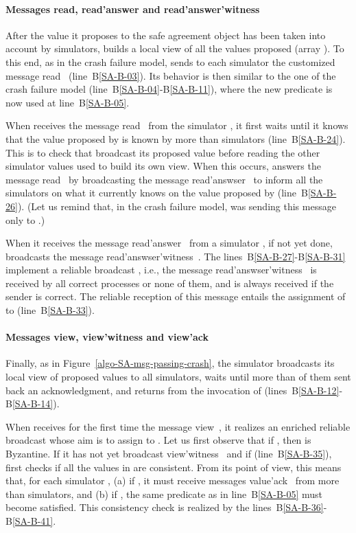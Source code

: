 \documentclass[11pt,letterpaper]{article}
\begin{document}
\paragraph{Messages {\sc read}, {\sc read'answer} and
          {\sc read'answer'witness}}
 After the value  it proposes to the safe agreement object has been
taken  into  account by  simulators,    builds a
local view  of all the values proposed (array ). To this end, as in  the crash
failure model,    sends to each simulator  the customized message
{\sc read}~ (line~B\ref{SA-B-03}).
Its behavior is then similar to the one of the crash failure model
(line~B\ref{SA-B-04}-B\ref{SA-B-11}), where the new predicate
 is now used at
line~B\ref{SA-B-05}.


When   receives  the message   {\sc read}~  from  the simulator
, it first waits until it knows that the  value proposed by 
is known by more than  simulators (line~B\ref{SA-B-24}).
This is to check that  broadcast its proposed value before
reading the other simulator values used  to build its own view.
When  this   occurs,   answers the  message {\sc  read}~
by broadcasting the message  {\sc read'answser}~
 to inform all the simulators on what it currently knows on the value
proposed by  (line~B\ref{SA-B-26}). (Let us remind that, in  the
crash failure model,  was sending this message only to .)



When it receives the message {\sc read'answer}~ from a simulator
,  if not yet done,    broadcasts the message
{\sc read'answser'witness}~.
The lines~B\ref{SA-B-27}-B\ref{SA-B-31} implement a reliable broadcast
\cite{B87}, i.e., the message {\sc read'answser'witness}~
is   received by all correct  processes  or none of  them,  and is  always
received if the sender is correct. The reliable  reception of  this
message entails the assignment of  to 
(line~B\ref{SA-B-33}).


\paragraph{Messages {\sc view}, {\sc view'witness}
           and {\sc view'ack}}
Finally, as in Figure~\ref{algo-SA-msg-passing-crash},
the simulator  broadcasts its local view of proposed values to
all  simulators, waits until more than   of them sent back an
acknowledgment, and returns  from  the  invocation  of
 (lines~B\ref{SA-B-12}-B\ref{SA-B-14}).


When  receives for the first time the message  {\sc view}~,
it realizes an enriched reliable broadcast whose aim is to assign
 to . Let us first observe that if ,
then  is Byzantine. If it has not yet broadcast
{\sc  view'witness}~ and  if 
(line~B\ref{SA-B-35}),  first
checks if all the  values in   are  consistent.
From its  point of view, this means that, for each simulator ,
(a) if , it must  receive messages {\sc value'ack}~
from more than  simulators, and (b) if  ,
the same predicate as in line~B\ref{SA-B-05} must become satisfied.
This consistency check is realized by the lines~B\ref{SA-B-36}-B\ref{SA-B-41}.
\end{document}
